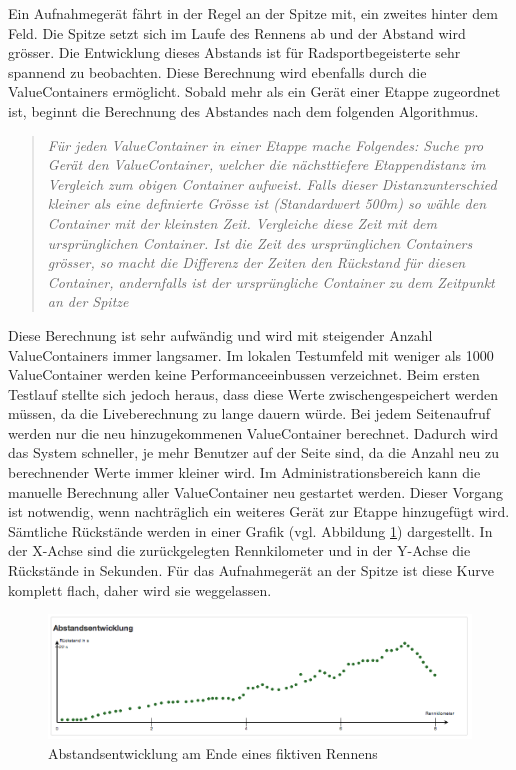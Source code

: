 Ein Aufnahmegerät fährt in der Regel an der Spitze mit, ein zweites hinter dem Feld. Die Spitze setzt sich im Laufe des Rennens ab und der Abstand wird grösser. Die Entwicklung dieses Abstands ist für Radsportbegeisterte sehr spannend zu beobachten. Diese Berechnung wird ebenfalls durch die ValueContainers ermöglicht. Sobald mehr als ein Gerät einer Etappe zugeordnet ist, beginnt die Berechnung des Abstandes nach dem folgenden Algorithmus.
\begin{quotation}
\textit{Für jeden ValueContainer in einer Etappe mache Folgendes:
Suche pro Gerät den ValueContainer, welcher die nächsttiefere Etappendistanz im Vergleich zum obigen Container aufweist. Falls dieser Distanzunterschied kleiner als eine definierte Grösse ist (Standardwert 500m) so wähle den Container mit der kleinsten Zeit. Vergleiche diese Zeit mit dem ursprünglichen Container. Ist die Zeit des ursprünglichen Containers grösser, so macht die Differenz der Zeiten den Rückstand für diesen Container, andernfalls ist der ursprüngliche Container zu dem Zeitpunkt an der Spitze}
\end{quotation}

Diese Berechnung ist sehr aufwändig und wird mit steigender Anzahl ValueContainers immer langsamer. Im lokalen Testumfeld mit weniger als 1000 ValueContainer werden keine Performanceeinbussen verzeichnet. Beim ersten Testlauf stellte sich jedoch heraus, dass diese Werte zwischengespeichert werden müssen, da die Liveberechnung zu lange dauern würde. Bei jedem Seitenaufruf werden nur die neu hinzugekommenen ValueContainer berechnet. Dadurch wird das System schneller, je mehr Benutzer auf der Seite sind, da die Anzahl neu zu berechnender Werte immer kleiner wird. Im Administrationsbereich kann die manuelle Berechnung aller ValueContainer neu gestartet werden. Dieser Vorgang ist notwendig, wenn nachträglich ein weiteres Gerät zur Etappe hinzugefügt wird.
\\

Sämtliche Rückstände werden in einer Grafik (vgl. Abbildung  \ref{fig:abstandsentwicklung2}) dargestellt. In der X-Achse sind die zurückgelegten Rennkilometer und in der Y-Achse die Rückstände in Sekunden. Für das Aufnahmegerät an der Spitze ist diese Kurve komplett flach, daher wird sie weggelassen.

\begin{figure}[H]
	\centering
	\includegraphics[width=130mm]{images/tourliveweb/abstandsentwicklung2.png}
	\caption{Abstandsentwicklung am Ende eines fiktiven Rennens}
	\label{fig:abstandsentwicklung2}
\end{figure}

